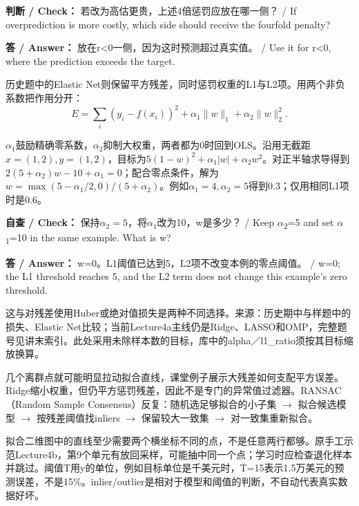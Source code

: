 \textbf{判断 / Check：} 若改为高估更贵，上述4倍惩罚应放在哪一侧？ / If overprediction is more costly, which side should receive the fourfold penalty?


\textbf{答 / Answer：} 放在r<0一侧，因为这时预测超过真实值。 / Use it for r<0, where the prediction exceeds the target.


历史题中的Elastic Net则保留平方残差，同时惩罚权重的L1与L2项。用两个非负系数把作用分开：
\[
E=\sum_i(y_i-f(x_i))^2+\alpha_1\|w\|_1+\alpha_2\|w\|_2^2.
\tag{4.15a}
\]


\(\alpha_1\)鼓励精确零系数，\(\alpha_2\)抑制大权重，两者都为0时回到OLS。沿用无截距\(x=(1,2),y=(1,2)\)，目标为\(5(1-w)^2+\alpha_1|w|+\alpha_2w^2\)。对正半轴求导得到\(2(5+\alpha_2)w-10+\alpha_1=0\)；配合零点条件，解为\(w=\max(5-\alpha_1/2,0)/(5+\alpha_2)\)。例如\(\alpha_1=4,\alpha_2=5\)得到0.3；仅用相同L1项时是0.6。


\textbf{自查 / Check：} 保持\(\alpha_2=5\)，将\(\alpha_1\)改为10，w是多少？ / Keep \ensuremath{\alpha}\textsubscript{2}=5 and set \ensuremath{\alpha}\textsubscript{1}=10 in the same example. What is w?


\textbf{答 / Answer：} w=0。L1阈值已达到5，L2项不改变本例的零点阈值。 / w=0; the L1 threshold reaches 5, and the L2 term does not change this example's zero threshold.


这与对残差使用Huber或绝对值损失是两种不同选择。来源：历史期中与样题中的损失、Elastic Net比较；当前Lecture4a主线仍是Ridge、LASSO和OMP，完整题号见讲末索引。此处采用未除样本数的目标，库中的alpha／l1\_ratio须按其目标缩放换算。








几个离群点就可能明显拉动拟合直线，课堂例子展示大残差如何支配平方误差。Ridge缩小权重，但仍平方惩罚残差，因此不是专门的异常值过滤器。RANSAC（Random Sample Consensus）反复：随机选足够拟合的小子集 \ensuremath{\to} 拟合候选模型 \ensuremath{\to} 按残差阈值找inliers \ensuremath{\to} 保留较大一致集 \ensuremath{\to} 对一致集重新拟合。


拟合二维图中的直线至少需要两个横坐标不同的点，不是任意两行都够。原手工示范Lecture4b，第9个单元有放回采样，可能抽中同一个点；学习时应检查退化样本并跳过。阈值T用y的单位，例如目标单位是千美元时，T=15表示1.5万美元的预测误差，不是15\%。inlier/outlier是相对于模型和阈值的判断，不自动代表真实数据好坏。



